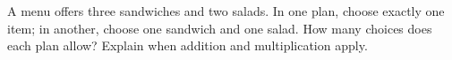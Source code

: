 A menu offers three sandwiches and two salads. In one plan, choose exactly one item; in another, choose one sandwich and one salad. How many choices does each plan allow? Explain when addition and multiplication apply.
